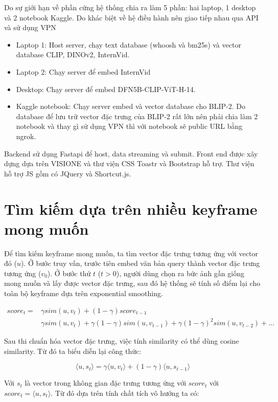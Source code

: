 \documentclass{article}
\begin{document}
Do sự giới hạn về phần cứng hệ thống chia ra làm 5 phần: hai laptop, 1 desktop và 2 notebook Kaggle. Do khác biệt về hệ điều hành nên giao tiếp nhau qua API và sử dụng VPN

\begin{itemize}
    \item Laptop 1: Host server, chạy text database (whoosh và bm25s) và vector database CLIP, DINOv2, InternVid.
    \item Laptop 2: Chạy server để embed InternVid
    \item Desktop: Chạy server để embed DFN5B-CLIP-ViT-H-14.
    \item Kaggle notebook: Chạy server embed và vector database cho BLIP-2. Do database để lưu trữ vector đặc trưng của BLIP-2 rất lớn nên phải chia làm 2 notebook và thay gì sử dụng VPN thì với notebook sẽ public URL bằng ngrok. 
\end{itemize}

Backend sử dụng Fastapi để host, data streaming và submit. Front end được xây dựng dựa trên VISIONE và thư viện CSS Toastr và Bootstrap hỗ trợ. Thư viện hỗ trợ JS gồm có JQuery và Shortcut.js.

\section{Tìm kiếm dựa trên nhiều keyframe mong muốn}
Để tìm kiếm keyframe mong muốn, ta tìm vector đặc trưng tương ứng với vector đó ($u$). Ở bước truy vấn, trước tiên embed văn bản query thành vector đặc trưng tương ứng ($v_0$). Ở bước thứ $t$ ($t>0$), người dùng chọn ra bức ảnh gần giống mong muốn và lấy được vector đặc trưng, sau đó hệ thống sẽ tính số điểm lại cho toàn bộ keyframe dựa trên exponential smoothing.

\begin{equation*}
\begin{split}
score_t= &\gamma sim(u,v_t)+(1-\gamma)score_{t-1}\\
&\gamma sim(u,v_t )+\gamma(1-\gamma)sim(u,v_{t-1} )+\gamma(1-\gamma)^2 sim(u,v_{t-2} )+\dotsc
\end{split}
\end{equation*}

Sau thi chuẩn hóa vector đặc trưng, việc tính similarity có thể dùng cosine similarity. Từ đó ta biểu diễn lại công thức:

\[\langle u,s_t \rangle = 
\gamma \langle u,v_t \rangle+(1-\gamma)\langle u,s_{t-1} \rangle\]

Với $s_t$ là vector trong không gian đặc trưng tương ứng với $score_t$ với $score_t=\langle u,s_t \rangle$. Từ đó dựa trên tính chất tích vô hướng ta có:
\end{document}

